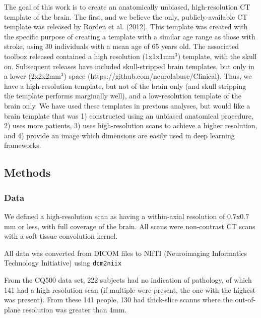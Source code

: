 \documentclass[]{elsarticle} %
\begin{document}
The goal of this work is to create an anatomically unbiased, high-resolution CT template of the brain. The first, and we believe the only, publicly-available CT template was released by Rorden et al. (2012). This template was created with the specific purpose of creating a template with a similar age range as those with stroke, using 30 individuals with a mean age of 65 years old. The associated toolbox released contained a high resolution (1x1x1mm\(^3\)) template, with the skull on. Subsequent releases have included skull-stripped brain templates, but only in a lower (2x2x2mm\(^3\)) space (https://github.com/neurolabusc/Clinical). Thus, we have a high-resolution template, but not of the brain only (and skull stripping the template performs marginally well), and a low-resolution template of the brain only.
We have used these templates in previous analyses, but would like a brain template that was 1) constructed using an unbiased anatomical procedure, 2) uses more patients, 3) uses high-resolution scans to achieve a higher resolution, and 4) provide an image which dimensions are easily used in deep learning frameworks.

\hypertarget{methods}{%
\subsection{Methods}\label{methods}}

\hypertarget{data}{%
\subsubsection{Data}\label{data}}

We defined a high-resolution scan as having a within-axial resolution of \(0.7\)x\(0.7\)mm or less, with full coverage of the brain. All scans were non-contrast CT scans with a soft-tissue convolution kernel.

All data was converted from DICOM files to NIfTI (Neuroimaging Informatics Technology Initiative) using \texttt{dcm2niix}

From the CQ500 data set, 222 subjects had no indication of pathology, of which 141 had a high-resolution scan (if multiple were present, the one with the highest was present). From these 141 people, 130 had thick-slice scanns where the out-of-plane resolution was greater than \(4\)mm.
\end{document}
